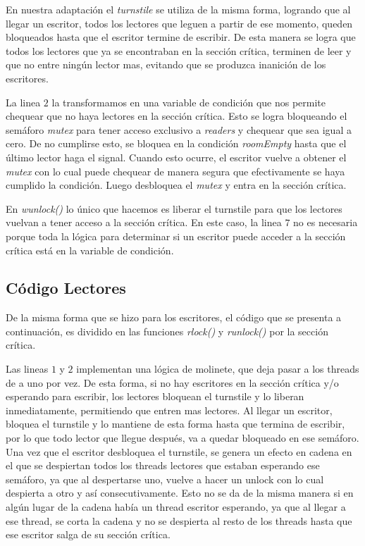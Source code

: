 \documentclass[a4,11pt]{article}
\begin{document}


En nuestra adaptación el \emph{turnstile} se utiliza de la misma forma, logrando que al llegar un escritor, todos los lectores que leguen a partir de ese momento, queden bloqueados hasta que el escritor termine de escribir. De esta manera se logra que todos los lectores que ya se encontraban en la sección crítica, terminen de leer y que no entre ningún lector mas, evitando que se produzca inanición de los escritores.

La linea $2$ la transformamos en una variable de condición que nos permite chequear que no haya lectores en la sección crítica. Esto se logra bloqueando el semáforo \emph{mutex} para tener acceso exclusivo a \emph{readers} y chequear que sea igual a cero. De no cumplirse esto, se bloquea en la condición \emph{roomEmpty} hasta que el último lector haga el signal. Cuando esto ocurre, el escritor vuelve a obtener el \emph{mutex} con lo cual puede chequear de manera segura que efectivamente se haya cumplido la condición. Luego desbloquea el \emph{mutex} y entra en la sección crítica.

En \emph{wunlock()} lo único que hacemos es liberar el turnstile para que los lectores vuelvan a tener acceso a la sección crítica. En este caso, la linea $7$ no es necesaria porque toda la lógica para determinar si un escritor puede acceder a la sección crítica está en la variable de condición. 

\subsection{Código Lectores}
De la misma forma que se hizo para los escritores, el código que se presenta a continuación, es dividido en las funciones \emph{rlock()} y \emph{runlock()} por la sección crítica.



Las lineas $1$ y $2$ implementan una lógica de molinete, que deja pasar a los threads de a uno por vez. De esta forma, si no hay escritores en la sección crítica y/o esperando para escribir, los lectores bloquean el turnstile y lo liberan inmediatamente, permitiendo que entren mas lectores. Al llegar un escritor, bloquea el turnstile y lo mantiene de esta forma hasta que termina de escribir, por lo que todo lector que llegue después, va a quedar bloqueado en ese semáforo. Una vez que el escritor desbloquea el turnstile, se genera un efecto en cadena en el que se despiertan todos los threads lectores que estaban esperando ese semáforo, ya que al despertarse uno, vuelve a hacer un unlock con lo cual despierta a otro y así consecutivamente. Esto no se da de la misma manera si en algún lugar de la cadena había un thread escritor esperando, ya que al llegar a ese thread, se corta la cadena y no se despierta al resto de los threads hasta que ese escritor salga de su sección crítica.
\end{document}
